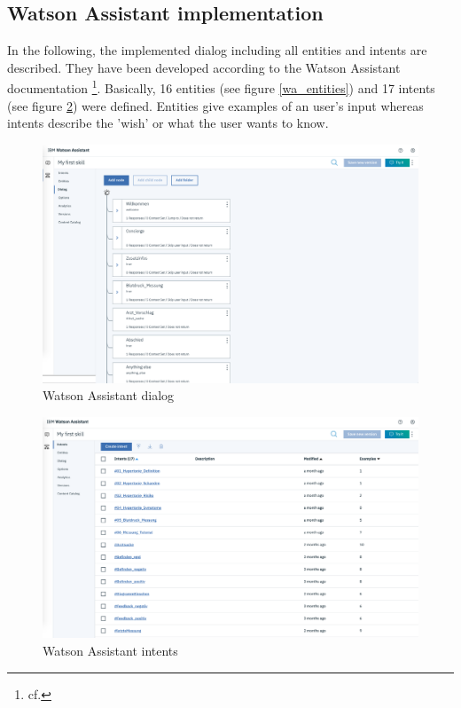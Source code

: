 \subsection{Watson Assistant implementation}
In the following, the implemented dialog including all entities and intents are described. They have been developed according to the Watson Assistant documentation \footnote{cf.\autocite{wa_docu}}.
Basically, 16 entities (see figure \ref{wa_entities}) and 17 intents (see figure \ref{wa_intents}) were defined. Entities give examples of an user's input whereas intents describe the 'wish' or what the user wants to know.
\begin{figure}[h!]
	\centering
	\includegraphics[width=1\textwidth]{images/WA_dialog.png}
	\caption{Watson Assistant dialog}
	\label{wa_dialog}
\end{figure}

\begin{figure}[h!]
	\centering
	\includegraphics[width=1\textwidth]{images/WA_intents.png}
	\caption{Watson Assistant intents}
	\label{wa_intents}
\end{figure}

